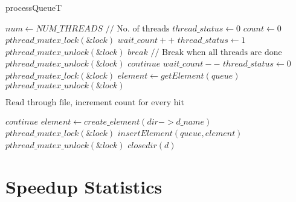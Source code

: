 \documentclass{article}
\begin{document}
\begin{algorithm}
\caption{processQueueT}\label{euclid}
\begin{algorithmic}[1]
\STATE $num \gets NUM\_THREADS \text{ // No. of threads}$
\STATE $thread\_status \gets 0$
\STATE $count \gets 0$
        \STATE $pthread\_mutex\_lock(\&lock)$
    \ENDIF
                \STATE $wait\_count++$
            \ENDIF
            \STATE $thread\_status \gets 1$
                \STATE $pthread\_mutex\_unlock(\&lock)$
                \STATE $break \text{ // Break when all threads are done}$ 
            \ELSE
                \STATE $pthread\_mutex\_unlock(\&lock)$
                \STATE $continue$
            \ENDIF
        \ENDIF
    \ENDIF
        \STATE $wait\_count--$
        \STATE $thread\_status \gets 0$
    \ENDIF
        \STATE $pthread\_mutex\_lock(\&lock)$
    \ENDIF
    \STATE $element \gets getElement(queue)$
        \STATE $pthread\_mutex\_unlock(\&lock)$
    \ENDIF
    
        \STATE $\text{Read through file, increment count for every hit}$
    \ENDIF
    
            \STATE $continue$
        \ENDIF
        \STATE $element \gets create\_element(dir->d\_name)$
            \STATE $pthread\_mutex\_lock(\&lock)$
        \ENDIF
        \STATE $insertElement(queue, element)$
            \STATE $pthread\_mutex\_unlock(\&lock)$
        \ENDIF
    \ENDWHILE
    \STATE $closedir(d)$
\ENDIF
\ENDWHILE
\STATE {}
\end{algorithmic}
\end{algorithm}

\clearpage

\section{Speedup Statistics}
\end{document}
